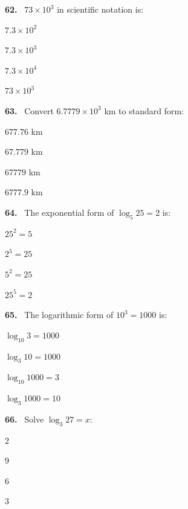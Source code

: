 \documentclass[11pt]{article}
\newenvironment{qenv}[1]{%
  \par\medskip\noindent\textbf{#1.}\ \ignorespaces
}{\par}
\begin{document}
\begin{qenv}{62} $73\times10^3$ in scientific notation is:
\begin{options} \item $7.3\times10^2$ \item $7.3\times10^3$ \item $7.3\times10^4$ \item $73\times10^3$ \end{options} \end{qenv}

\begin{qenv}{63} Convert $6.7779\times10^3$ km to standard form:
\begin{options} \item $677.76$ km \item $67.779$ km \item $67779$ km \item $6777.9$ km \end{options} \end{qenv}

\begin{qenv}{64} The exponential form of $\log_5 25=2$ is:
\begin{options} \item $25^2=5$ \item $2^5=25$ \item $5^2=25$ \item $25^5=2$ \end{options} \end{qenv}

\begin{qenv}{65} The logarithmic form of $10^3=1000$ is:
\begin{options} \item $\log_{10}3=1000$ \item $\log_{3}10=1000$ \item $\log_{10}1000=3$ \item $\log_{3}1000=10$ \end{options} \end{qenv}

\begin{qenv}{66} Solve $\log_3 27 = x$:
\begin{options} \item $2$ \item $9$ \item $6$ \item $3$ \end{options} \end{qenv}
\end{document}

